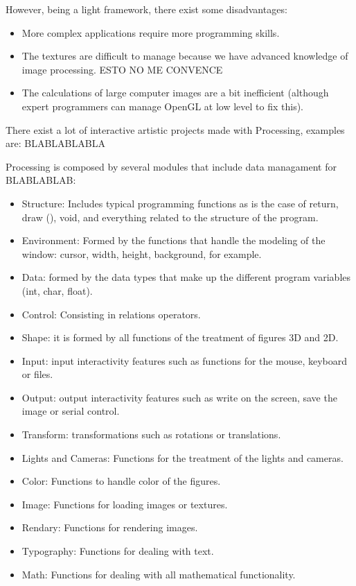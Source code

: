 \documentclass[conference]{IEEEtran}
\begin{document}
However, being a light framework, there exist some disadvantages:
\begin{itemize}
\item More complex applications require more programming skills.
\item The textures are difficult to manage because we have advanced knowledge of image processing. ESTO NO ME CONVENCE
\item The calculations of large computer images are a bit inefficient (although expert programmers can manage OpenGL at low level to fix this).
\end{itemize}

There exist a lot of interactive artistic projects made with Processing, examples are: BLABLABLABLA

Processing is composed by several modules that include data managament for BLABLABLAB:
\begin{itemize}
\item Structure: Includes typical programming functions as is the case of return, draw (), void, and everything related to the structure of the program.
\item Environment: Formed by the functions that handle the modeling of the window: cursor, width, height, background, for example.
\item Data: formed by the data types that make up the different program variables (int, char, float).
\item Control: Consisting in relations operators.
\item Shape: it is formed by all functions of the treatment of figures 3D and 2D.
\item Input: input interactivity features such as functions for the mouse, keyboard or files.
\item Output: output interactivity features such as write on the screen, save the image or serial control.
\item Transform: transformations such as rotations or translations.
\item Lights and Cameras: Functions for the treatment of the lights and cameras.
\item Color: Functions to handle color of the figures.
\item Image: Functions for loading images or textures.
\item Rendary: Functions for rendering images.
\item Typography: Functions for dealing with text.
\item Math: Functions for dealing with all mathematical functionality.
\end{itemize}
\end{document}
